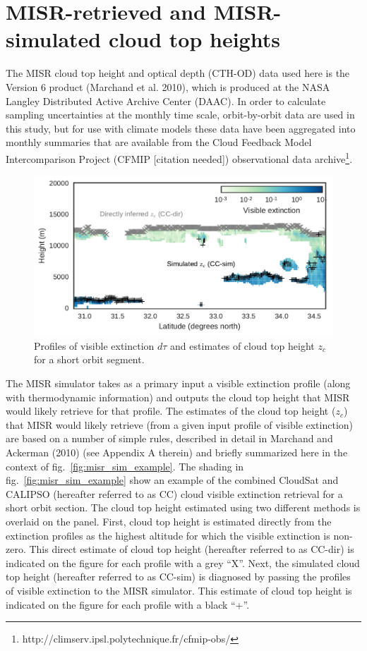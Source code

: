 \section{MISR-retrieved and MISR-simulated cloud top
heights}\label{sec:misrux5fretrievals}

The MISR cloud top height and optical depth (CTH-OD) data used here is
the Version 6 product (Marchand et al. 2010), which is produced at the
NASA Langley Distributed Active Archive Center (DAAC). In order to
calculate sampling uncertainties at the monthly time scale,
orbit-by-orbit data are used in this study, but for use with climate
models these data have been aggregated into monthly summaries that are
available from the Cloud Feedback Model Intercomparison Project (CFMIP
{[}citation needed{]}) observational data archive\footnote{http://climserv.ipsl.polytechnique.fr/cfmip-obs/}.

\begin{figure}[htbp]
\centering
\includegraphics{graphics/misr_sim_example.pdf}
\caption{\label{fig:misr_sim_example}Profiles of visible extinction
\(d\tau\) and estimates of cloud top height \(z_c\) for a short orbit
segment.}\label{fig:misrux5fsimux5fexample}
\end{figure}

The MISR simulator takes as a primary input a visible extinction profile
(along with thermodynamic information) and outputs the cloud top height
that MISR would likely retrieve for that profile. The estimates of the
cloud top height (\(z_c\)) that MISR would likely retrieve (from a given
input profile of visible extinction) are based on a number of simple
rules, described in detail in Marchand and Ackerman (2010) (see Appendix
A therein) and briefly summarized here in the context of
fig.~\ref{fig:misr_sim_example}. The shading in
fig.~\ref{fig:misr_sim_example} show an example of the combined CloudSat
and CALIPSO (hereafter referred to as CC) cloud visible extinction
retrieval for a short orbit section. The cloud top height estimated
using two different methods is overlaid on the panel. First, cloud top
height is estimated directly from the extinction profiles as the highest
altitude for which the visible extinction is non-zero. This direct
estimate of cloud top height (hereafter referred to as CC-dir) is
indicated on the figure for each profile with a grey ``X''. Next, the
simulated cloud top height (hereafter referred to as CC-sim) is
diagnosed by passing the profiles of visible extinction to the MISR
simulator. This estimate of cloud top height is indicated on the figure
for each profile with a black ``+''.

